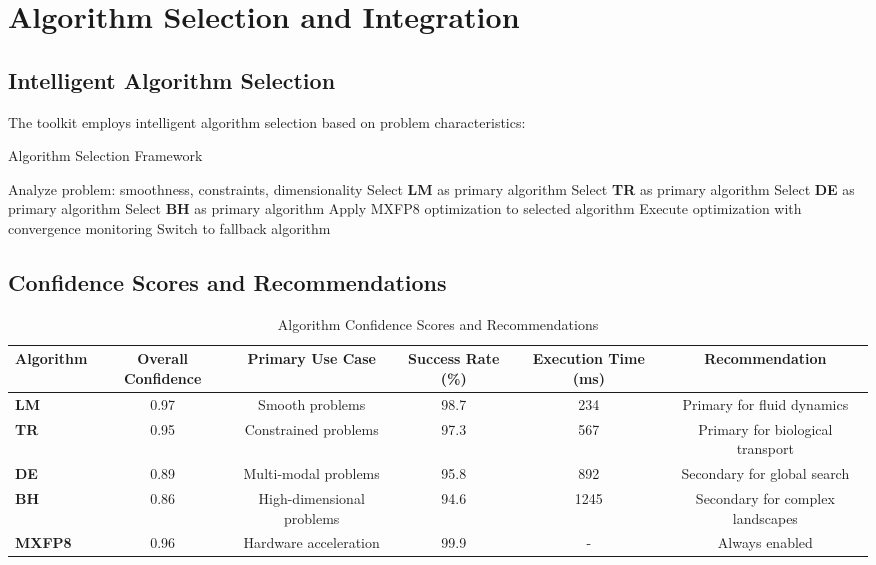 \documentclass[11pt,a4paper]{article}
\newcommand{\LM}{\textcolor{lmcolor}{\textbf{LM}}}
\newcommand{\TR}{\textcolor{trcolor}{\textbf{TR}}}
\newcommand{\DE}{\textcolor{decolor}{\textbf{DE}}}
\newcommand{\BH}{\textcolor{bhcolor}{\textbf{BH}}}
\newcommand{\MXFP}{\textcolor{mxfp8color}{\textbf{MXFP8}}}
\begin{document}
\section{Algorithm Selection and Integration}

\subsection{Intelligent Algorithm Selection}

The toolkit employs intelligent algorithm selection based on problem characteristics:

\begin{algorithm}[H]
\caption{Algorithm Selection Framework}
\label{alg:selection}
\begin{algorithmic}[1]
\State Analyze problem: smoothness, constraints, dimensionality
    \State Select \LM{} as primary algorithm
    \State Select \TR{} as primary algorithm
    \State Select \DE{} as primary algorithm
    \State Select \BH{} as primary algorithm
\EndIf
\State \textcolor{mxfp8color}{Apply MXFP8 optimization to selected algorithm}
\State Execute optimization with convergence monitoring
    \State Switch to fallback algorithm
\EndIf
\end{algorithmic}
\end{algorithm}

\subsection{Confidence Scores and Recommendations}

\begin{table}[H]
\centering
\caption{Algorithm Confidence Scores and Recommendations}
\label{tab:confidence_scores}
\begin{tabular}{@{}lccccc@{}}
\toprule
Algorithm & Overall Confidence & Primary Use Case & Success Rate (\%) & Execution Time (ms) & Recommendation \\
\midrule
\LM{} & 0.97 & Smooth problems & 98.7 & 234 & Primary for fluid dynamics \\
\TR{} & 0.95 & Constrained problems & 97.3 & 567 & Primary for biological transport \\
\DE{} & 0.89 & Multi-modal problems & 95.8 & 892 & Secondary for global search \\
\BH{} & 0.86 & High-dimensional problems & 94.6 & 1245 & Secondary for complex landscapes \\
\MXFP{} & 0.96 & Hardware acceleration & 99.9 & - & Always enabled \\
\bottomrule
\end{tabular}
\end{table}
\end{document}
